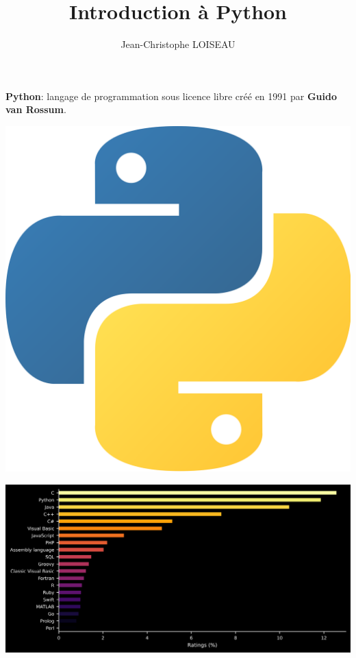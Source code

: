 \documentclass[aspectratio=169]{beamer}
\title{Introduction à Python}
\author{Jean-Christophe LOISEAU}
\institute{Arts \& Métiers Institute of Technology, 2021-2022}
\date{}
\begin{document}
\frame{\titlepage}

\begin{frame}%
  \vfill
  \begin{minipage}{.68\textwidth}
    \textbf{\alert{Python}}: langage de programmation sous licence libre créé en 1991 par \textbf{Guido van Rossum}.
  \end{minipage}%
  \hfill
  \begin{minipage}{.28\textwidth}
    \centering
    \includegraphics[width=\textwidth]{logo_python}
  \end{minipage}
  \vfill
\end{frame}

\begin{frame}
  \vfill
  \centering
  \includegraphics[width=\textwidth]{tiobe_ratings}
  \vfill
\end{frame}
\end{document}
